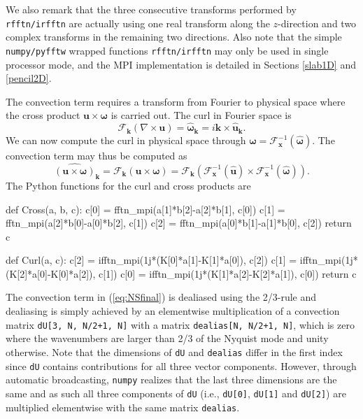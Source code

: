 \documentclass[11pt, oneside]{article}
\newcommand{\inpyth}{\lstinline[style=pythonstyle, basicstyle=\ttfamily]} %[]%
\begin{document}
We also remark that the three consecutive transforms performed by \inpyth{rfftn/irfftn} are actually using one real transform along the $z$-direction and two complex transforms in the remaining two directions. Also note that the simple \texttt{numpy/pyfftw} wrapped functions \inpyth{rfftn/irfftn} may only be used in single processor mode, and the MPI implementation is detailed in Sections
\ref{slab1D} and \ref{pencil2D}.

The convection term requires a transform from Fourier to physical space where the cross product $\bm{u} \times \bm{\omega}$ is carried out. The curl in Fourier space is
\begin{equation}
\mathcal{F}_{\bm{k}}(\nabla \times \bm{u}) = \hat{\bm{\omega}}_{\bm{k}} = i \bm{k} \times \hat{\bm{u}}_{\bm{k}}.
\end{equation}
We can now compute the curl in physical space through $\bm{\omega} = \mathcal{F}_{\bm{x}}^{-1}(\hat{\bm{\omega}})$. The convection term may thus be computed as
\begin{equation}
\widehat{( \bm{u} \times \bm{\omega})}_{\bm{k}} = \mathcal{F}_{\bm{k}}(\bm{u} \times \bm{\omega}) = \mathcal{F}_{\bm{k}} (\mathcal{F}^{-1}_{\bm{x}}(\hat{\bm{u}}) \times \mathcal{F}^{-1}_{\bm{x}}(\hat{\bm{\omega}})).
\end{equation}
The Python functions for the curl and cross products are

\begin{python}
def Cross(a, b, c):
    c[0] = fftn_mpi(a[1]*b[2]-a[2]*b[1], c[0])
    c[1] = fftn_mpi(a[2]*b[0]-a[0]*b[2], c[1])
    c[2] = fftn_mpi(a[0]*b[1]-a[1]*b[0], c[2])
    return c

def Curl(a, c):
    c[2] = ifftn_mpi(1j*(K[0]*a[1]-K[1]*a[0]), c[2])
    c[1] = ifftn_mpi(1j*(K[2]*a[0]-K[0]*a[2]), c[1])
    c[0] = ifftn_mpi(1j*(K[1]*a[2]-K[2]*a[1]), c[0])
    return c
\end{python}

The convection term in (\ref{eq:NSfinal}) is dealiased using the 2/3-rule and dealiasing is simply achieved by an elementwise multiplication of a convection matrix \inpyth{dU[3, N, N/2+1, N]} with a matrix \inpyth{dealias[N, N/2+1, N]}, which is zero where the wavenumbers are larger than 2/3 of the Nyquist mode and unity otherwise. Note that the dimensions of \inpyth{dU} and \inpyth{dealias} differ in the first index since \inpyth{dU} contains contributions for all three vector components. However, through automatic broadcasting, \texttt{numpy} realizes that the last three dimensions are the same and as such all three components of \inpyth{dU} (i.e.,  \inpyth{dU[0]}, \inpyth{dU[1]} and  \inpyth{dU[2]}) are multiplied elementwise with the same matrix \inpyth{dealias}.
\end{document}
